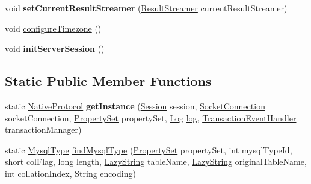 \begin{DoxyCompactItemize}
void {\bfseries set\+Current\+Result\+Streamer} (\mbox{\hyperlink{interfacecom_1_1mysql_1_1cj_1_1protocol_1_1_result_streamer}{Result\+Streamer}} current\+Result\+Streamer)
\item 
void \mbox{\hyperlink{classcom_1_1mysql_1_1cj_1_1protocol_1_1a_1_1_native_protocol_a125fe378f81937bcf676327f270f8025}{configure\+Timezone}} ()
\item 
\mbox{\label{classcom_1_1mysql_1_1cj_1_1protocol_1_1a_1_1_native_protocol_a61e852702d328b23aa56145df3608e51}} 
void {\bfseries init\+Server\+Session} ()
\end{DoxyCompactItemize}
\subsection*{Static Public Member Functions}
\begin{DoxyCompactItemize}
\item 
\mbox{\label{classcom_1_1mysql_1_1cj_1_1protocol_1_1a_1_1_native_protocol_a7e5653b7c284dc8a41a41a65e1b0cd81}} 
static \mbox{\hyperlink{classcom_1_1mysql_1_1cj_1_1protocol_1_1a_1_1_native_protocol}{Native\+Protocol}} {\bfseries get\+Instance} (\mbox{\hyperlink{interfacecom_1_1mysql_1_1cj_1_1_session}{Session}} session, \mbox{\hyperlink{interfacecom_1_1mysql_1_1cj_1_1protocol_1_1_socket_connection}{Socket\+Connection}} socket\+Connection, \mbox{\hyperlink{interfacecom_1_1mysql_1_1cj_1_1conf_1_1_property_set}{Property\+Set}} property\+Set, \mbox{\hyperlink{interfacecom_1_1mysql_1_1cj_1_1log_1_1_log}{Log}} \mbox{\hyperlink{classcom_1_1mysql_1_1cj_1_1protocol_1_1_abstract_protocol_a3c27ad2f43100d6650c4a71b833190cc}{log}}, \mbox{\hyperlink{interfacecom_1_1mysql_1_1cj_1_1_transaction_event_handler}{Transaction\+Event\+Handler}} transaction\+Manager)
\item 
static \mbox{\hyperlink{enumcom_1_1mysql_1_1cj_1_1_mysql_type}{Mysql\+Type}} \mbox{\hyperlink{classcom_1_1mysql_1_1cj_1_1protocol_1_1a_1_1_native_protocol_a2b0c29f057a3332e2c8d070341361f32}{find\+Mysql\+Type}} (\mbox{\hyperlink{interfacecom_1_1mysql_1_1cj_1_1conf_1_1_property_set}{Property\+Set}} property\+Set, int mysql\+Type\+Id, short col\+Flag, long length, \mbox{\hyperlink{classcom_1_1mysql_1_1cj_1_1util_1_1_lazy_string}{Lazy\+String}} table\+Name, \mbox{\hyperlink{classcom_1_1mysql_1_1cj_1_1util_1_1_lazy_string}{Lazy\+String}} original\+Table\+Name, int collation\+Index, String encoding)
\end{DoxyCompactItemize}
